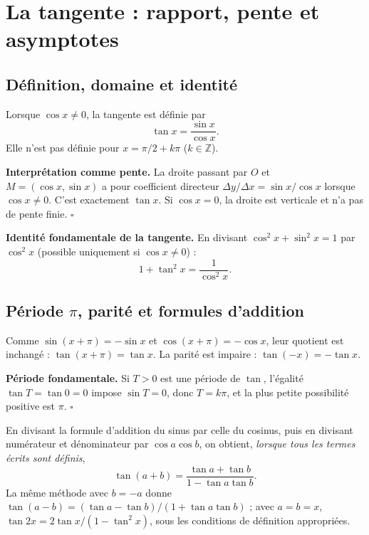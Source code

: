 \documentclass[../cours_spe_trigo.tex]{subfiles}
\begin{document}
\setcounter{chapter}{8}
\chapter{La tangente : rapport, pente et asymptotes}
\section{Définition, domaine et identité}
\begin{definition}
Lorsque $\cos x\ne0$, la tangente est définie par
\[\boxed{\tan x=\frac{\sin x}{\cos x}.}\]
Elle n'est pas définie pour $x=\pi/2+k\pi$ ($k\in\mathbb Z$).
\end{definition}
\begin{demonstration}
\textbf{Interprétation comme pente.} La droite passant par $O$ et $M=(\cos x,\sin x)$ a pour coefficient directeur $\Delta y/\Delta x=\sin x/\cos x$ lorsque $\cos x\ne0$. C'est exactement $\tan x$. Si $\cos x=0$, la droite est verticale et n'a pas de pente finie. $\square$
\end{demonstration}
\begin{demonstration}
\textbf{Identité fondamentale de la tangente.} En divisant $\cos^2x+\sin^2x=1$ par $\cos^2x$ (possible uniquement si $\cos x\ne0$) :
\[\boxed{1+\tan^2x=\frac1{\cos^2x}.}\]
\end{demonstration}
\section{Période $\pi$, parité et formules d'addition}
Comme $\sin(x+\pi)=-\sin x$ et $\cos(x+\pi)=-\cos x$, leur quotient est inchangé : $\tan(x+\pi)=\tan x$. La parité est impaire : $\tan(-x)=-\tan x$.
\begin{demonstration}
\textbf{Période fondamentale.} Si $T>0$ est une période de $\tan$, l'égalité $\tan T=\tan0=0$ impose $\sin T=0$, donc $T=k\pi$, et la plus petite possibilité positive est $\pi$. $\square$
\end{demonstration}
En divisant la formule d'addition du sinus par celle du cosinus, puis en divisant numérateur et dénominateur par $\cos a\cos b$, on obtient, \emph{lorsque tous les termes écrits sont définis},
\[
\boxed{\tan(a+b)=\frac{\tan a+\tan b}{1-\tan a\tan b}.}
\]
La même méthode avec $b=-a$ donne $\tan(a-b)=(\tan a-\tan b)/(1+\tan a\tan b)$ ; avec $a=b=x$, $\tan2x=2\tan x/(1-\tan^2x)$, sous les conditions de définition appropriées.
\end{document}
